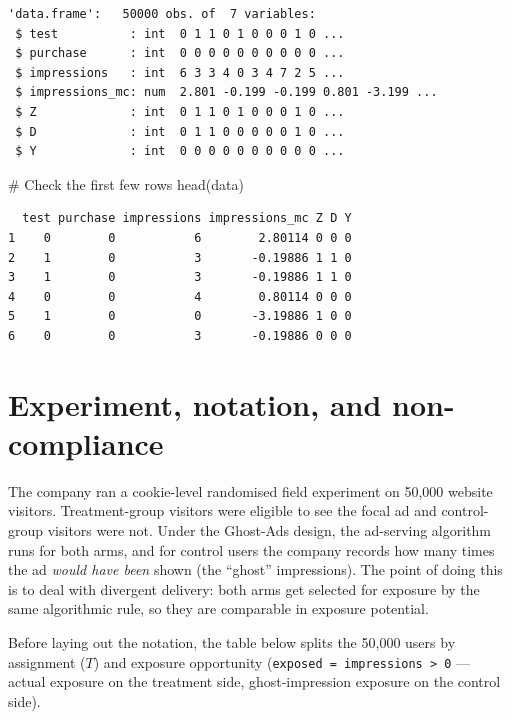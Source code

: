 \documentclass[
  letterpaper,
  DIV=11,
  numbers=noendperiod]{scrartcl}
\newenvironment{Shaded}{\begin{snugshade}}{\end{snugshade}}
\newcommand{\CommentTok}[1]{\textcolor[rgb]{0.37,0.37,0.37}{#1}}
\newcommand{\FunctionTok}[1]{\textcolor[rgb]{0.28,0.35,0.67}{#1}}
\newcommand{\NormalTok}[1]{\textcolor[rgb]{0.00,0.23,0.31}{#1}}
\begin{document}
\begin{verbatim}
'data.frame':   50000 obs. of  7 variables:
 $ test          : int  0 1 1 0 1 0 0 0 1 0 ...
 $ purchase      : int  0 0 0 0 0 0 0 0 0 0 ...
 $ impressions   : int  6 3 3 4 0 3 4 7 2 5 ...
 $ impressions_mc: num  2.801 -0.199 -0.199 0.801 -3.199 ...
 $ Z             : int  0 1 1 0 1 0 0 0 1 0 ...
 $ D             : int  0 1 1 0 0 0 0 0 1 0 ...
 $ Y             : int  0 0 0 0 0 0 0 0 0 0 ...
\end{verbatim}

\begin{Shaded}
\begin{Highlighting}[]
\CommentTok{\# Check the first few rows}
\FunctionTok{head}\NormalTok{(data)}
\end{Highlighting}
\end{Shaded}

\begin{verbatim}
  test purchase impressions impressions_mc Z D Y
1    0        0           6        2.80114 0 0 0
2    1        0           3       -0.19886 1 1 0
3    1        0           3       -0.19886 1 1 0
4    0        0           4        0.80114 0 0 0
5    1        0           0       -3.19886 1 0 0
6    0        0           3       -0.19886 0 0 0
\end{verbatim}

\section{Experiment, notation, and
non-compliance}\label{experiment-notation-and-non-compliance}

The company ran a cookie-level randomised field experiment on 50,000
website visitors. Treatment-group visitors were eligible to see the
focal ad and control-group visitors were not. Under the Ghost-Ads
design, the ad-serving algorithm runs for both arms, and for control
users the company records how many times the ad \emph{would have been}
shown (the ``ghost'' impressions). The point of doing this is to deal
with divergent delivery: both arms get selected for exposure by the same
algorithmic rule, so they are comparable in exposure potential.

Before laying out the notation, the table below splits the 50,000 users
by assignment (\(T\)) and exposure opportunity
(\texttt{exposed\ =\ impressions\ \textgreater{}\ 0} --- actual exposure
on the treatment side, ghost-impression exposure on the control side).
\end{document}
